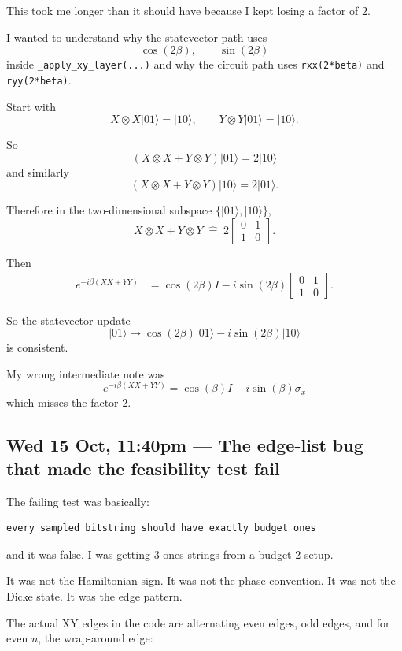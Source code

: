 \documentclass[11pt]{article}
\newcommand{\entry}[2]{\subsection*{#1 --- #2}}
\newcommand{\repo}[1]{\texttt{#1}}
\begin{document}
This took me longer than it should have because I kept losing a factor of \(2\).

I wanted to understand why the statevector path uses
\[
\cos(2\beta), \qquad \sin(2\beta)
\]
inside \repo{\_apply\_xy\_layer(...)} and why the circuit path uses
\repo{rxx(2*beta)} and \repo{ryy(2*beta)}.

Start with
\[
X \otimes X \lvert 01 \rangle = \lvert 10 \rangle,
\qquad
Y \otimes Y \lvert 01 \rangle = \lvert 10 \rangle.
\]

So
\[
(X\otimes X + Y\otimes Y)\lvert 01\rangle = 2 \lvert 10 \rangle
\]
and similarly
\[
(X\otimes X + Y\otimes Y)\lvert 10\rangle = 2 \lvert 01 \rangle.
\]

Therefore in the two-dimensional subspace \(\{|01\rangle,|10\rangle\}\),
\[
X\otimes X + Y\otimes Y
\;\widehat{=}\;
2
\begin{bmatrix}
0 & 1 \\
1 & 0
\end{bmatrix}.
\]

Then
\begin{align*}
e^{-i\beta (X X + Y Y)}
&=
\cos(2\beta) I
- i \sin(2\beta)
\begin{bmatrix}
0 & 1 \\
1 & 0
\end{bmatrix}.
\end{align*}

So the statevector update
\[
\lvert 01\rangle \mapsto \cos(2\beta)\lvert 01\rangle - i\sin(2\beta)\lvert 10\rangle
\]
is consistent.

My wrong intermediate note was
\[
e^{-i\beta(X X + Y Y)} = \cos(\beta)I - i \sin(\beta) \sigma_x
\]
which misses the factor \(2\).

\entry{Wed 15 Oct, 11:40pm}{The edge-list bug that made the feasibility test fail}

The failing test was basically:

\begin{lstlisting}
every sampled bitstring should have exactly budget ones
\end{lstlisting}

and it was false. I was getting 3-ones strings from a budget-2 setup.

It was not the Hamiltonian sign. It was not the phase convention. It was not the Dicke state.
It was the edge pattern.

The actual XY edges in the code are alternating even edges, odd edges, and for even \(n\),
the wrap-around edge:
\end{document}
